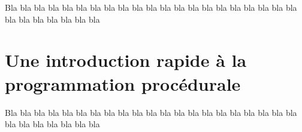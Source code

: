 \documentclass{article}
\begin{document}
Bla bla bla bla bla bla bla bla bla bla bla bla bla bla
bla bla bla bla bla bla bla bla bla bla bla bla bla bla


\section{Une introduction rapide à la programmation procédurale}

Bla bla bla bla bla bla bla bla bla bla bla bla bla bla
bla bla bla bla bla bla bla bla bla bla bla bla bla bla
\end{document}
